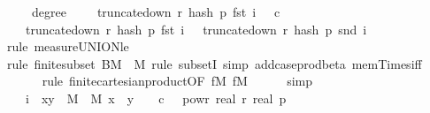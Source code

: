 \begin{isabellebody}
\ \ \ \ {\isacharbraceleft}{\kern0pt}{\isasymomega}{\isachardot}{\kern0pt}\ degree\ {\isasymomega}\ {\isasymge}\ {}\ {\isasymand}\ truncate{\isacharunderscore}{\kern0pt}down\ r\ {\isacharparenleft}{\kern0pt}hash\ p\ {\isacharparenleft}{\kern0pt}fst\ i{\isacharparenright}{\kern0pt}\ {\isasymomega}{\isacharparenright}{\kern0pt}\ {\isasymle}\ c\ {\isasymand}\isanewline
\ \ \ \ truncate{\isacharunderscore}{\kern0pt}down\ r\ {\isacharparenleft}{\kern0pt}hash\ p\ {\isacharparenleft}{\kern0pt}fst\ i{\isacharparenright}{\kern0pt}\ {\isasymomega}{\isacharparenright}{\kern0pt}\ {\isacharequal}{\kern0pt}\ truncate{\isacharunderscore}{\kern0pt}down\ r\ {\isacharparenleft}{\kern0pt}hash\ p\ {\isacharparenleft}{\kern0pt}snd\ i{\isacharparenright}{\kern0pt}\ {\isasymomega}{\isacharparenright}{\kern0pt}{\isacharbraceright}{\kern0pt}{\isacharparenright}{\kern0pt}{\isachardoublequoteclose}\isanewline
\ \ \ \ \isamarkupfalse%
\ {\isacharparenleft}{\kern0pt}rule\ measure{\isacharunderscore}{\kern0pt}UNION{\isacharunderscore}{\kern0pt}le{\isacharparenright}{\kern0pt}\isanewline
\ \ \ \ \ \isamarkupfalse%
\ {\isacharparenleft}{\kern0pt}rule\ finite{\isacharunderscore}{\kern0pt}subset{\isacharbrackleft}{\kern0pt}\ B{\isacharequal}{\kern0pt}{\isachardoublequoteopen}M\ {\isasymtimes}\ M{\isachardoublequoteclose}{\isacharbrackright}{\kern0pt}{\isacharcomma}{\kern0pt}\ rule\ subsetI{\isacharcomma}{\kern0pt}\ simp\ add{\isacharcolon}{\kern0pt}case{\isacharunderscore}{\kern0pt}prod{\isacharunderscore}{\kern0pt}beta\ mem{\isacharunderscore}{\kern0pt}Times{\isacharunderscore}{\kern0pt}iff{\isacharparenright}{\kern0pt}\isanewline
\ \ \ \ \ \isamarkupfalse%
\ {\isacharparenleft}{\kern0pt}rule\ finite{\isacharunderscore}{\kern0pt}cartesian{\isacharunderscore}{\kern0pt}product{\isacharbrackleft}{\kern0pt}OF\ f{\isacharunderscore}{\kern0pt}M\ f{\isacharunderscore}{\kern0pt}M{\isacharbrackright}{\kern0pt}{\isacharparenright}{\kern0pt}\isanewline
\ \ \ \ \isamarkupfalse%
\ simp\isanewline
\ \ \isamarkupfalse%
\ \isamarkupfalse%
\ {\isachardoublequoteopen}{\isachardot}{\kern0pt}{\isachardot}{\kern0pt}{\isachardot}{\kern0pt}\ {\isasymle}\ {\isacharparenleft}{\kern0pt}{\isasymSum}\ i\ {\isasymin}\ {\isacharbraceleft}{\kern0pt}{\isacharparenleft}{\kern0pt}x{\isacharcomma}{\kern0pt}y{\isacharparenright}{\kern0pt}\ {\isasymin}\ M\ {\isasymtimes}\ M{\isachardot}{\kern0pt}\ x\ {\isacharless}{\kern0pt}\ y{\isacharbraceright}{\kern0pt}{\isachardot}{\kern0pt}\ {}{}\ \ {\isacharasterisk}{\kern0pt}\ c\ {\isacharasterisk}{\kern0pt}\ {}\ powr\ {\isacharparenleft}{\kern0pt}{\isacharminus}{\kern0pt}real\ r{\isacharparenright}{\kern0pt}\ {\isacharslash}{\kern0pt}{\isacharparenleft}{\kern0pt}real\ p{\isacharparenright}{\kern0pt}\isanewline

\end{isabellebody}
